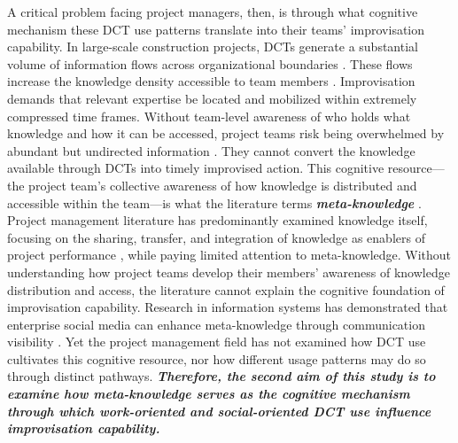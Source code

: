 \documentclass[authoryear,preprint,review,times,10pt]{elsarticle}
\begin{document}
A critical problem facing project managers, then, is through what cognitive mechanism these DCT use patterns translate into their teams' improvisation capability. In large-scale construction projects, DCTs generate a substantial volume of information flows across organizational boundaries \citep{treem2013Social}. These flows increase the knowledge density accessible to team members \citep{leonardi2015Ambient}. Improvisation demands that relevant expertise be located and mobilized within extremely compressed time frames. Without team-level awareness of who holds what knowledge and how it can be accessed, project teams risk being overwhelmed by abundant but undirected information \citep{sun2021Dark}. They cannot convert the knowledge available through DCTs into timely improvised action. This cognitive resource---the project team's collective awareness of how knowledge is distributed and accessible within the team---is what the literature terms \textbf{\textit{meta-knowledge}} \citep{wegner1987Transactive, leonardi2014Social}. Project management literature has predominantly examined knowledge itself, focusing on the sharing, transfer, and integration of knowledge as enablers of project performance \citep{jia2025Knowledge, hu2024Performance}, while paying limited attention to meta-knowledge. Without understanding how project teams develop their members' awareness of knowledge distribution and access, the literature cannot explain the cognitive foundation of improvisation capability. Research in information systems has demonstrated that enterprise social media can enhance meta-knowledge through communication visibility \citep{leonardi2014Social, engelbrecht2019How}. Yet the project management field has not examined how DCT use cultivates this cognitive resource, nor how different usage patterns may do so through distinct pathways. \textbf{\textit{Therefore, the second aim of this study is to examine how meta-knowledge serves as the cognitive mechanism through which work-oriented and social-oriented DCT use influence improvisation capability.}}
\end{document}
